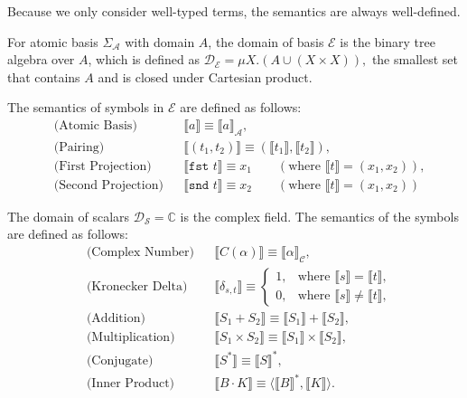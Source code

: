 \documentclass[manuscript, review, timestamp]{acmart}
\newcommand*{\fst}{\texttt{fst }}
\newcommand*{\snd}{\texttt{snd }}
\newcommand*{\sem}[1]{{\llbracket #1 \rrbracket}}
\begin{document}
Because we only consider well-typed terms, the semantics are always well-defined.


\begin{definition}
  For atomic basis $\Sigma_\mathcal{A}$ with domain $A$, the domain of basis $\mathcal{E}$ is the binary tree algebra over $A$, which is defined as 
  $
  \mathcal{D}_\mathcal{E} = \mu X.(A \cup (X \times X)),
  $
  the smallest set that contains $A$ and is closed under Cartesian product.

  The semantics of symbols in $\mathcal{E}$ are defined as follows:
  \begin{align*}
    & \text{(Atomic Basis)} && \sem{a} \equiv \sem{a}_\mathcal{A}, \\
    & \text{(Pairing)} &&
    \sem{(t_1, t_2)} \equiv (\sem{t_1}, \sem{t_2}), \\
    & \text{(First Projection)} &&
    \sem{\fst t} \equiv x_1 \qquad (\text{where } \sem{t} = (x_1, x_2)), \\
    & \text{(Second Projection)} &&
    \sem{\snd t} \equiv x_2 \qquad (\text{where } \sem{t} = (x_1, x_2))
  \end{align*}
\end{definition}


\begin{definition}
  The domain of scalars $\mathcal{D}_\mathcal{S} = \mathbb{C}$ is the complex field.
  The semantics of the symbols are defined as follows:
  \begin{align*}
    & \text{(Complex Number)} &&
    \sem{C(\alpha)} \equiv \sem{\alpha}_\mathcal{C}, \\
    & \text{(Kronecker Delta)} &&
    \sem{\delta_{s, t}} \equiv \left\{
      \begin{array}{ll}
        1, & \text{where } \sem{s} = \sem{t}, \\
        0, & \text{where } \sem{s} \neq \sem{t}, 
      \end{array}
    \right. \\
    & \text{(Addition)} &&
    \sem{S_1 + S_2} \equiv \sem{S_1} + \sem{S_2}, \\
    & \text{(Multiplication)} &&
    \sem{S_1 \times S_2} \equiv \sem{S_1} \times \sem{S_2}, \\
    & \text{(Conjugate)} &&
    \sem{S^*} \equiv \sem{S}^*, \\
    & \text{(Inner Product)} &&
    \sem{B \cdot K} \equiv \langle \sem{B}^*, \sem{K} \rangle.
  \end{align*}
\end{definition}
\end{document}
